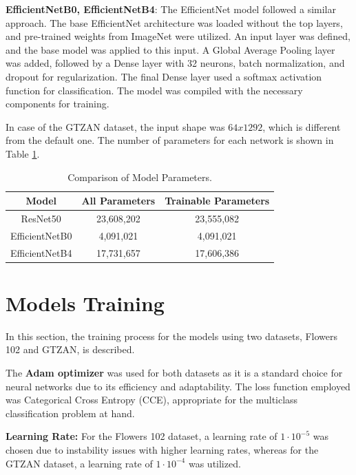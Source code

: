 \textbf{EfficientNetB0, EfficientNetB4}:  The EfficientNet model followed a similar approach. The base EfficientNet architecture was loaded without the top layers, and pre-trained weights from ImageNet were utilized. An input layer was defined, and the base model was applied to this input. A Global Average Pooling layer was added, followed by a Dense layer with 32 neurons, batch normalization, and dropout for regularization. The final Dense layer used a softmax activation function for classification. The model was compiled with the necessary components for training.

In case of the GTZAN dataset, the input shape was $64 x 1292$, which is different from the default one. The number of parameters for each network is shown in Table \ref{tab:modelParameters}.
\begin{table}[h]
    \centering
    \caption{Comparison of Model Parameters.}
    \begin{tabular}{|c|c|c|}
        \hline
        \textbf{Model} & \textbf{All Parameters} & \textbf{Trainable Parameters} \\
        \hline
        ResNet50 & 23,608,202 & 23,555,082 \\
        \hline
        EfficientNetB0 & 4,091,021 & 4,091,021 \\
        \hline
        EfficientNetB4 & 17,731,657 & 17,606,386 \\
        \hline
    \end{tabular}
    \label{tab:modelParameters}
\end{table}


\section{Models Training}

In this section, the training process for the models using two datasets, Flowers 102 and GTZAN, is described.

The \textbf{Adam optimizer} was used for both datasets as it is a standard choice for neural networks due to its efficiency and adaptability. The loss function employed was Categorical Cross Entropy (CCE), appropriate for the multiclass classification problem at hand.

\textbf{Learning Rate:} For the Flowers 102 dataset, a learning rate of $1 \cdot 10^{-5}$ was chosen due to instability issues with higher learning rates, whereas for the GTZAN dataset, a learning rate of $1 \cdot 10^{-4}$ was utilized.

